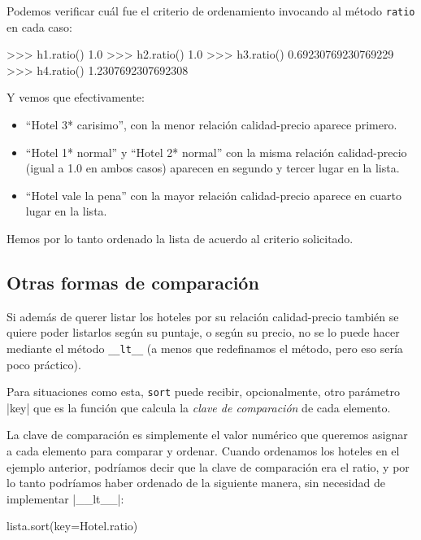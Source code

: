 Podemos verificar cuál fue el criterio de ordenamiento invocando al
método \lstinline!ratio! en cada caso:

\begin{codigo-python-sn}
>>> h1.ratio()
1.0
>>> h2.ratio()
1.0
>>> h3.ratio()
0.69230769230769229
>>> h4.ratio()
1.2307692307692308
\end{codigo-python-sn}

Y vemos que efectivamente:

\begin{itemize}
\item ``Hotel 3* carisimo'', con la menor relación calidad-precio
aparece primero.

\item ``Hotel 1* normal'' y ``Hotel 2* normal'' con la misma relación
calidad-precio (igual a 1.0 en ambos casos) aparecen en segundo
y tercer lugar en la lista.

\item ``Hotel vale la pena'' con la mayor relación calidad-precio
aparece en cuarto lugar en la lista.
\end{itemize}

Hemos por lo tanto ordenado la lista de acuerdo al criterio solicitado.

\subsection{Otras formas de comparación}

Si además de querer listar los hoteles por su relación calidad-precio
también se quiere poder listarlos según su puntaje, o según su precio, no
se lo puede hacer mediante el método \lstinline!__lt__! (a menos que
redefinamos el método, pero eso sería poco práctico).

Para situaciones como esta, \lstinline!sort! puede recibir, opcionalmente,
otro parámetro |key| que es la función que calcula la {\it clave de comparación}
de cada elemento.

La clave de comparación es simplemente el valor numérico que queremos asignar a
cada elemento para comparar y ordenar. Cuando ordenamos los hoteles en el
ejemplo anterior, podríamos decir que la clave de comparación era el ratio, y
por lo tanto podríamos haber ordenado de la siguiente manera, sin necesidad de
implementar |__lt__|:

\begin{codigo-python-sn}
lista.sort(key=Hotel.ratio)
\end{codigo-python-sn}

